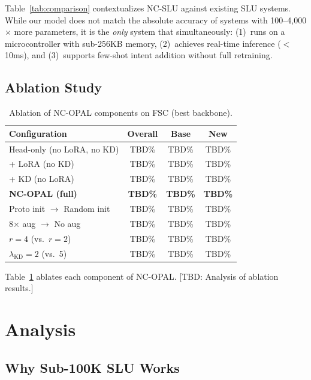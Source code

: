 \documentclass[11pt]{article}
\begin{document}
Table~\ref{tab:comparison} contextualizes NC-SLU against existing SLU systems.
While our model does not match the absolute accuracy of systems with 100--4,000$\times$ more parameters, it is the \emph{only} system that simultaneously:
(1)~runs on a microcontroller with sub-256KB memory,
(2)~achieves real-time inference ($<$10ms), and
(3)~supports few-shot intent addition without full retraining.

\subsection{Ablation Study}

\begin{table}[t]
\centering
\small
\caption{Ablation of NC-OPAL components on FSC (best backbone).}
\label{tab:ablation}
\begin{tabular}{@{}lccc@{}}
\toprule
\textbf{Configuration} & \textbf{Overall} & \textbf{Base} & \textbf{New} \\
\midrule
Head-only (no LoRA, no KD)     & TBD\% & TBD\% & TBD\% \\
+ LoRA (no KD)                  & TBD\% & TBD\% & TBD\% \\
+ KD (no LoRA)                  & TBD\% & TBD\% & TBD\% \\
\textbf{NC-OPAL (full)}         & \textbf{TBD\%} & \textbf{TBD\%} & \textbf{TBD\%} \\
\midrule
Proto init $\rightarrow$ Random init & TBD\% & TBD\% & TBD\% \\
8$\times$ aug $\rightarrow$ No aug   & TBD\% & TBD\% & TBD\% \\
$r{=}4$ (vs.\ $r{=}2$)             & TBD\% & TBD\% & TBD\% \\
$\lambda_{\text{KD}}{=}2$ (vs.\ 5) & TBD\% & TBD\% & TBD\% \\
\bottomrule
\end{tabular}
\end{table}

Table~\ref{tab:ablation} ablates each component of NC-OPAL.
[TBD: Analysis of ablation results.]

\section{Analysis}

\subsection{Why Sub-100K SLU Works}
\end{document}
